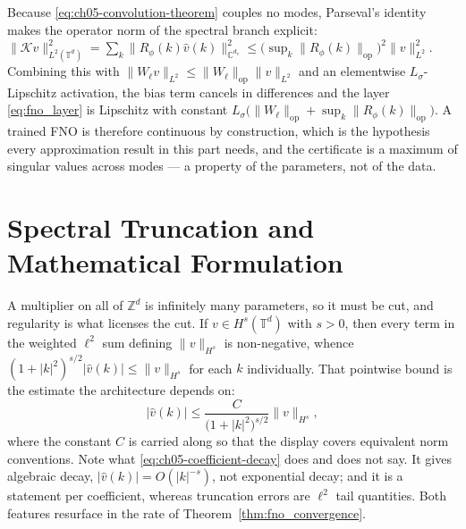 \begin{remark}
\label{rem:ch05-lipschitz}
Because \eqref{eq:ch05-convolution-theorem} couples no modes, Parseval's
identity makes the operator norm of the spectral branch explicit:
$\|\mathcal{K} v\|_{L^2(\mathbb{T}^d)}^2 = \sum_{k} \|R_\phi(k)\hat{v}(k)\|_{\mathbb{C}^{d_v}}^2
\le \big(\sup_{k}\|R_\phi(k)\|_{\mathrm{op}}\big)^2 \|v\|_{L^2}^2$.
Combining this with $\|W_\ell v\|_{L^2} \le \|W_\ell\|_{\mathrm{op}}\|v\|_{L^2}$
and an elementwise $L_\sigma$-Lipschitz activation, the bias term cancels in
differences and the layer \eqref{eq:fno_layer} is Lipschitz with constant
$L_\sigma\big(\|W_\ell\|_{\mathrm{op}} + \sup_k \|R_\phi(k)\|_{\mathrm{op}}\big)$.
A trained FNO is therefore continuous by construction, which is the hypothesis
every approximation result in this part needs, and the certificate is a maximum
of singular values across modes --- a property of the parameters, not of the
data.
\end{remark}

\section{Spectral Truncation and Mathematical Formulation}
\label{sec:ch05-truncation}

A multiplier on all of $\mathbb{Z}^d$ is infinitely many parameters, so it must
be cut, and regularity is what licenses the cut. If $v \in H^s(\mathbb{T}^d)$
with $s > 0$, then every term in the weighted $\ell^2$ sum defining
$\|v\|_{H^s}$ is non-negative, whence
$(1+|k|^2)^{s/2}|\hat{v}(k)| \le \|v\|_{H^s}$ for each $k$ individually. That
pointwise bound is the estimate the architecture depends on:
\begin{equation}
  \label{eq:ch05-coefficient-decay}
  |\hat{v}(k)| \le \frac{C}{\big(1 + |k|^2\big)^{s/2}} \|v\|_{H^s},
\end{equation}
where the constant $C$ is carried along so that the display covers equivalent
norm conventions. Note what \eqref{eq:ch05-coefficient-decay} does and does not
say. It gives algebraic decay, $|\hat{v}(k)| = O(|k|^{-s})$, not exponential
decay; and it is a statement per coefficient, whereas truncation errors are
$\ell^2$ tail quantities. Both features resurface in the rate of
Theorem~\ref{thm:fno_convergence}.

